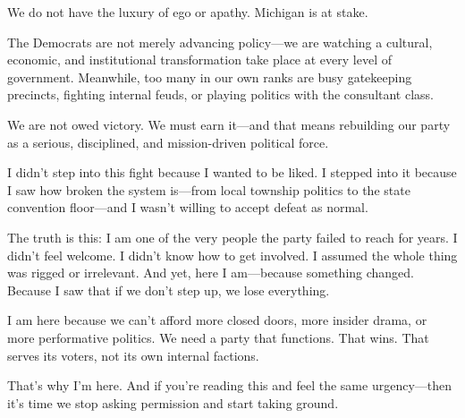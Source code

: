 \documentclass[12pt]{book}
\begin{document}
We do not have the luxury of ego or apathy. Michigan is at stake.

The Democrats are not merely advancing policy—we are watching a cultural, economic, and institutional transformation take place at every level of government. Meanwhile, too many in our own ranks are busy gatekeeping precincts, fighting internal feuds, or playing politics with the consultant class.

We are not owed victory. We must earn it—and that means rebuilding our party as a serious, disciplined, and mission-driven political force.

I didn’t step into this fight because I wanted to be liked. I stepped into it because I saw how broken the system is—from local township politics to the state convention floor—and I wasn’t willing to accept defeat as normal.

The truth is this: I am one of the very people the party failed to reach for years. I didn’t feel welcome. I didn’t know how to get involved. I assumed the whole thing was rigged or irrelevant. And yet, here I am—because something changed. Because I saw that if we don’t step up, we lose everything.

I am here because we can’t afford more closed doors, more insider drama, or more performative politics. We need a party that functions. That wins. That serves its voters, not its own internal factions.

That’s why I’m here. And if you're reading this and feel the same urgency—then it's time we stop asking permission and start taking ground.


\clearpage  

\clearpage 

\end{document}
